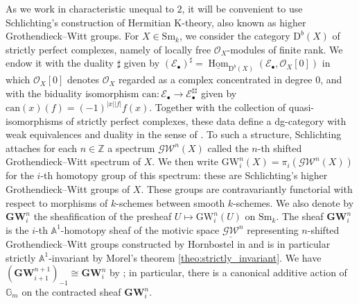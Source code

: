 \documentclass[11pt,leqno]{amsart}
\newcommand{\GW}{\mathbf{GW}}
\newcommand{\Hom}{\operatorname{Hom}}
\newcommand{\Osc}{{\mathscr{O}}}
\newcommand{\Esc}{{\mathscr{E}}}
\renewcommand{\1}{{\rm 1\hspace*{-0.4ex}%
\rule{0.1ex}{1.52ex}\hspace*{0.2ex}}}
\newcommand{\Sm}{\mathrm{Sm}}
\newcommand{\<}[1]{{\langle}#1 {\rangle}}
\newcommand{\Kr}{\mathrm{K}}
\newcommand{\GWr}{\mathrm{GW}}
\newcommand{\Zb}{\mathbb{Z}}
\newcommand{\Abb}{\mathbb{A}}
\newcommand{\Dr}{\mathrm{D}}
\theoremstyle{plain}
\theoremstyle{definition}
\theoremstyle{remark}
\numberwithin{equation}{section}
\begin{document}
As we work in characteristic unequal to $2$, it will be convenient to use Schlichting's construction \cite{schlichtingHermitianKtheoryDerived2017} of Hermitian $\Kr$-theory, also known as higher Grothendieck--Witt groups. For $X\in\Sm_k$, we consider the category $\Dr^b(X)$ of strictly perfect complexes, namely of locally free $\Osc_X$-modules of finite rank. We endow it with the duality $\sharp$ given by $(\Esc_\bullet)^\sharp=\underline{\Hom}_{\Dr^b(X)}(\Esc_\bullet,\Osc_X[0])$ in which $\Osc_X[0]$ denotes $\Osc_X$ regarded as a complex concentrated in degree $0$, and with the biduality isomorphism $\mathrm{can}:\Esc_\bullet\to\Esc_\bullet^{\sharp\sharp}$ given by $\mathrm{can}(x)(f)=(-1)^{|x||f|}f(x)$. Together with the collection of quasi-isomorphisms of strictly perfect complexes, these data define a dg-category with weak equivalences and duality in the sense of \cite{schlichtingHermitianKtheoryDerived2017}. To such a structure, Schlichting attaches for each $n\in\Zb$ a spectrum $\mathscr{GW}^n(X)$ called the $n$-th shifted Grothendieck--Witt spectrum of $X$. We then write $\GWr_i^n(X)=\pi_i(\mathscr{GW}^n(X))$ for the $i$-th homotopy group of this spectrum: these are Schlichting's higher Grothendieck--Witt groups of $X$. These groups are contravariantly functorial with respect to morphisms of $k$-schemes between smooth $k$-schemes. We also denote by $\GW_i^n$ the sheafification of the presheaf $U\mapsto\GWr_i^n(U)$ on $\Sm_k$. The sheaf $\GW_i^n$ is the $i$-th $\Abb^1$-homotopy sheaf of the motivic space $\underline{\mathcal{GW}}^n$ representing $n$-shifted Grothendieck--Witt groups constructed by Hornbostel in \cite{hornbostelA1representabilityHermitianKtheory2005} and is in particular strictly $\Abb^1$-invariant by Morel's theorem \ref{theo:strictly_invariant}. We have $(\GW_{i+1}^{n+1})_{-1}\cong\GW_{i}^{n}$ by \cite[Proposition 4.4]{asokCohomologicalClassificationVector2014}; in particular, there is a canonical additive action of $\mathbb{G}_m$ on the contracted sheaf $\GW_i^n$.
\end{document}
